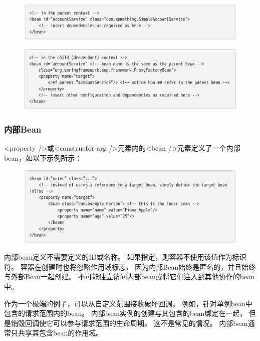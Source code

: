 \begin{figure}[ht]
    \centering
    \includegraphics[width=1\linewidth]{./Figure/IMG_code_38.png}
\end{figure}

\begin{figure}[ht]
    \centering
    \includegraphics[width=1\linewidth]{./Figure/IMG_code_39.png}
\end{figure}

\newpage
\subsubsection{内部Bean}
<property />或<constructor-arg />元素内的<bean />元素定义了一个内部bean，如以下示例所示：

\begin{figure}[ht]
    \centering
    \includegraphics[width=1\linewidth]{./Figure/IMG_code_40.png}
\end{figure}

内部bean定义不需要定义的ID或名称。
如果指定，则容器不使用该值作为标识符。
容器在创建时也将忽略作用域标志，
因为内部Bean始终是匿名的，并且始终与外部Bean一起创建。
不可能独立访问内部bean或将它们注入到其他协作的bean中。

作为一个极端的例子，可以从自定义范围接收破坏回调，
例如，针对单例bean中包含的请求范围内的bean。 
内部bean实例的创建与其包含的bean绑定在一起，
但是销毁回调使它可以参与请求范围的生命周期。 
这不是常见的情况。 内部bean通常只共享其包含bean的作用域。

